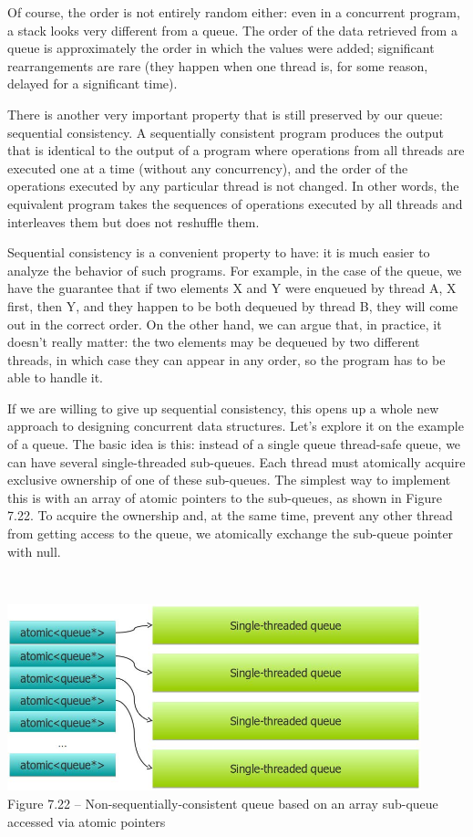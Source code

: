 Of course, the order is not entirely random either: even in a concurrent program, a stack looks very different from a queue. The order of the data retrieved from a queue is approximately the order in which the values were added; significant rearrangements are rare (they happen when one thread is, for some reason, delayed for a significant time).

There is another very important property that is still preserved by our queue: sequential consistency. A sequentially consistent program produces the output that is identical to the output of a program where operations from all threads are executed one at a time (without any concurrency), and the order of the operations executed by any particular thread is not changed. In other words, the equivalent program takes the sequences of operations executed by all threads and interleaves them but does not reshuffle them. 

Sequential consistency is a convenient property to have: it is much easier to analyze the behavior of such programs. For example, in the case of the queue, we have the guarantee that if two elements X and Y were enqueued by thread A, X first, then Y, and they happen to be both dequeued by thread B, they will come out in the correct order. On the other hand, we can argue that, in practice, it doesn't really matter: the two elements may be dequeued by two different threads, in which case they can appear in any order, so the program has to be able to handle it. 

If we are willing to give up sequential consistency, this opens up a whole new approach to designing concurrent data structures. Let's explore it on the example of a queue. The basic idea is this: instead of a single queue thread-safe queue, we can have several single-threaded sub-queues. Each thread must atomically acquire exclusive ownership of one of these sub-queues. The simplest way to implement this is with an array of atomic pointers to the sub-queues, as shown in Figure 7.22. To acquire the ownership and, at the same time, prevent any other thread from getting access to the queue, we atomically exchange the sub-queue pointer with null.

\hspace*{\fill} \\ %
\begin{center}
\includegraphics[width=0.9\textwidth]{content/2/chapter7/images/22.jpg}\\
Figure 7.22 – Non-sequentially-consistent queue based on an array sub-queue accessed via atomic 
pointers
\end{center}

